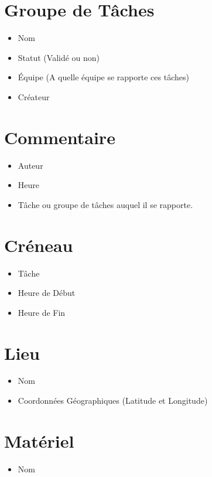 \section{Groupe de Tâches}
\begin{itemize}
 \item Nom
\item Statut (Validé ou non)
\item Équipe (A quelle équipe se rapporte ces tâches)
\item Créateur

\end{itemize}

\section{Commentaire}
\begin{itemize}
 \item Auteur
\item Heure
\item Tâche ou groupe de tâches auquel il se rapporte.

\end{itemize}


\section{Créneau}
\begin{itemize}
 \item Tâche
\item Heure de Début
\item Heure de Fin

\end{itemize}




\section{Lieu}
\begin{itemize}
\item Nom
\item Coordonnées Géographiques (Latitude et Longitude)

\end{itemize}

\section{Matériel}
\begin{itemize}
\item Nom


\end{itemize}
